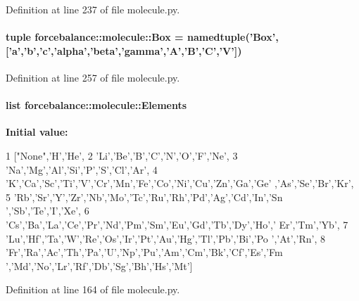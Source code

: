 \-Definition at line 237 of file molecule.\-py.

\hypertarget{namespaceforcebalance_1_1molecule_aa9de7b4fcb815b9f7ad490d461131e72}{
\paragraph[{\-Box}]{\setlength{\rightskip}{0pt plus 5cm}tuple {\bf forcebalance\-::molecule\-::\-Box} = namedtuple('{\bf \-Box}',\mbox{[}'a','b','c','alpha','beta','gamma','\-A','\-B','\-C','\-V'\mbox{]})}}\label{namespaceforcebalance_1_1molecule_aa9de7b4fcb815b9f7ad490d461131e72}


\-Definition at line 257 of file molecule.\-py.

\hypertarget{namespaceforcebalance_1_1molecule_af1987e9e7f33b828c15f1e4f7dcded2c}{
\paragraph[{\-Elements}]{\setlength{\rightskip}{0pt plus 5cm}list {\bf forcebalance\-::molecule\-::\-Elements}}}\label{namespaceforcebalance_1_1molecule_af1987e9e7f33b828c15f1e4f7dcded2c}
{\bfseries \-Initial value\-:}
\begin{DoxyCode}
1 ["None",'H','He',
2             'Li','Be','B','C','N','O','F','Ne',
3             'Na','Mg','Al','Si','P','S','Cl','Ar',
4             'K','Ca','Sc','Ti','V','Cr','Mn','Fe','Co','Ni','Cu','Zn','Ga','Ge'
      ,'As','Se','Br','Kr',
5             'Rb','Sr','Y','Zr','Nb','Mo','Tc','Ru','Rh','Pd','Ag','Cd','In','Sn
      ','Sb','Te','I','Xe',
6             'Cs','Ba','La','Ce','Pr','Nd','Pm','Sm','Eu','Gd','Tb','Dy','Ho','
      Er','Tm','Yb',
7             'Lu','Hf','Ta','W','Re','Os','Ir','Pt','Au','Hg','Tl','Pb','Bi','Po
      ','At','Rn',
8             'Fr','Ra','Ac','Th','Pa','U','Np','Pu','Am','Cm','Bk','Cf','Es','Fm
      ','Md','No','Lr','Rf','Db','Sg','Bh','Hs','Mt']
\end{DoxyCode}


\-Definition at line 164 of file molecule.\-py.

